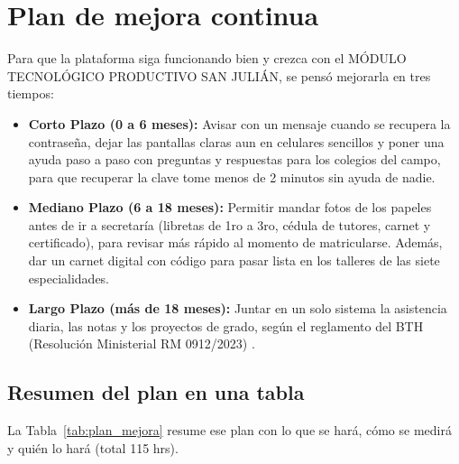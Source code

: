 \section{Plan de mejora continua}
\label{sec:plan_mejora}

Para que la plataforma siga funcionando bien y crezca con el MÓDULO TECNOLÓGICO PRODUCTIVO SAN JULIÁN, se pensó mejorarla en tres tiempos:

\begin{itemize}
    \item \textbf{Corto Plazo (0 a 6 meses):} Avisar con un mensaje cuando se recupera la contraseña, dejar las pantallas claras aun en celulares sencillos y poner una ayuda paso a paso con preguntas y respuestas para los colegios del campo, para que recuperar la clave tome menos de 2 minutos sin ayuda de nadie.
    \item \textbf{Mediano Plazo (6 a 18 meses):} Permitir mandar fotos de los papeles antes de ir a secretaría (libretas de 1ro a 3ro, cédula de tutores, carnet y certificado), para revisar más rápido al momento de matricularse. Además, dar un carnet digital con código para pasar lista en los talleres de las siete especialidades.
    \item \textbf{Largo Plazo (más de 18 meses):} Juntar en un solo sistema la asistencia diaria, las notas y los proyectos de grado, según el reglamento del BTH (Resolución Ministerial RM 0912/2023) \parencite{ministerioeducacion2023}.
\end{itemize}

\subsection{Resumen del plan en una tabla}
\label{sec:resumen_plan_mejora}

La Tabla~\ref{tab:plan_mejora} resume ese plan con lo que se hará, cómo se medirá y quién lo hará (total 115 hrs).


